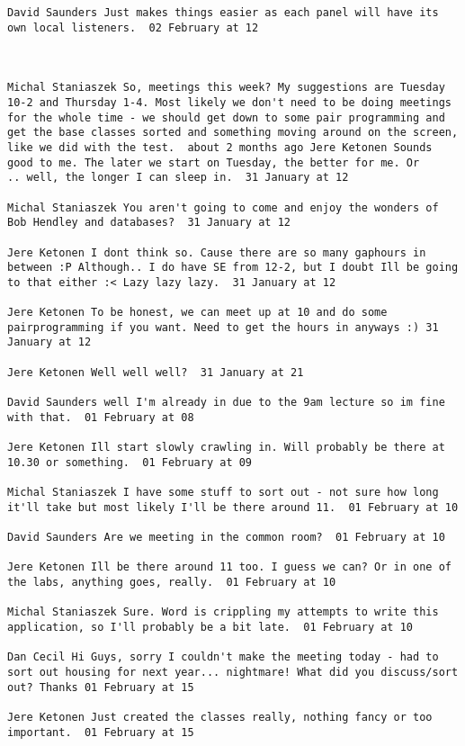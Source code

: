 \begin{verbatim}
David Saunders Just makes things easier as each panel will have its
own local listeners.  02 February at 12



Michal Staniaszek So, meetings this week? My suggestions are Tuesday
10-2 and Thursday 1-4. Most likely we don't need to be doing meetings
for the whole time - we should get down to some pair programming and
get the base classes sorted and something moving around on the screen,
like we did with the test.  about 2 months ago Jere Ketonen Sounds
good to me. The later we start on Tuesday, the better for me. Or
.. well, the longer I can sleep in.  31 January at 12

Michal Staniaszek You aren't going to come and enjoy the wonders of
Bob Hendley and databases?  31 January at 12

Jere Ketonen I dont think so. Cause there are so many gaphours in
between :P Although.. I do have SE from 12-2, but I doubt Ill be going
to that either :< Lazy lazy lazy.  31 January at 12

Jere Ketonen To be honest, we can meet up at 10 and do some
pairprogramming if you want. Need to get the hours in anyways :) 31
January at 12

Jere Ketonen Well well well?  31 January at 21

David Saunders well I'm already in due to the 9am lecture so im fine
with that.  01 February at 08

Jere Ketonen Ill start slowly crawling in. Will probably be there at
10.30 or something.  01 February at 09

Michal Staniaszek I have some stuff to sort out - not sure how long
it'll take but most likely I'll be there around 11.  01 February at 10

David Saunders Are we meeting in the common room?  01 February at 10

Jere Ketonen Ill be there around 11 too. I guess we can? Or in one of
the labs, anything goes, really.  01 February at 10

Michal Staniaszek Sure. Word is crippling my attempts to write this
application, so I'll probably be a bit late.  01 February at 10

Dan Cecil Hi Guys, sorry I couldn't make the meeting today - had to
sort out housing for next year... nightmare! What did you discuss/sort
out? Thanks 01 February at 15

Jere Ketonen Just created the classes really, nothing fancy or too
important.  01 February at 15


\end{verbatim}

